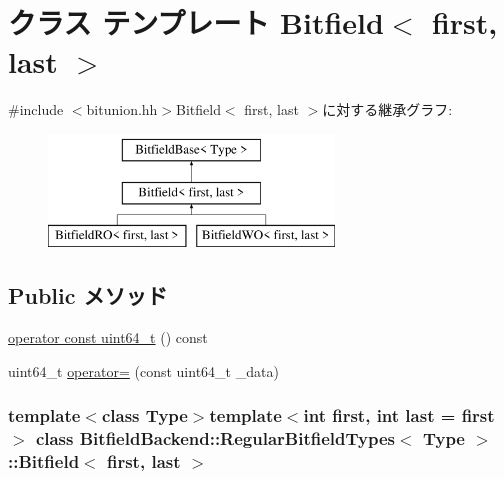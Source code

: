 \hypertarget{classBitfieldBackend_1_1RegularBitfieldTypes_1_1Bitfield}{
\section{クラス テンプレート Bitfield$<$ first, last $>$}
\label{classBitfieldBackend_1_1RegularBitfieldTypes_1_1Bitfield}
}


{\ttfamily \#include $<$bitunion.hh$>$}Bitfield$<$ first, last $>$に対する継承グラフ:\begin{figure}[H]
\begin{center}
\leavevmode
\includegraphics[height=3cm]{classBitfieldBackend_1_1RegularBitfieldTypes_1_1Bitfield}
\end{center}
\end{figure}
\subsection*{Public メソッド}
\begin{DoxyCompactItemize}
\item 
\hyperlink{classBitfieldBackend_1_1RegularBitfieldTypes_1_1Bitfield_a86f0216f6eb57ddf27a4f375c1d56d62}{operator const uint64\_\-t} () const 
\item 
uint64\_\-t \hyperlink{classBitfieldBackend_1_1RegularBitfieldTypes_1_1Bitfield_a89ce74f3480b6d588fa6e042d8753675}{operator=} (const uint64\_\-t \_\-data)
\end{DoxyCompactItemize}
\subsubsection*{template$<$class Type$>$template$<$int first, int last = first$>$ class BitfieldBackend::RegularBitfieldTypes$<$ Type $>$::Bitfield$<$ first, last $>$}



